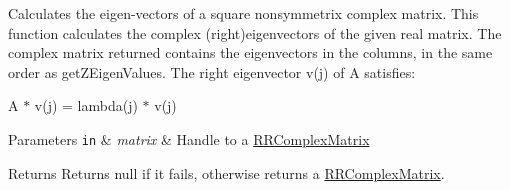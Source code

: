 Calculates the eigen-\/vectors of a square nonsymmetrix complex matrix. This function calculates the complex (right)eigenvectors of the given real matrix. The complex matrix returned contains the eigenvectors in the columns, in the same order as get\-Z\-Eigen\-Values. The right eigenvector v(j) of A satisfies\-: 

\begin{DoxyParagraph}{}
A $\ast$ v(j) = lambda(j) $\ast$ v(j) 
\end{DoxyParagraph}

\begin{DoxyParams}[1]{Parameters}
\mbox{\tt in}  & {\em matrix} & Handle to a \hyperlink{struct_r_r_complex_matrix}{R\-R\-Complex\-Matrix} \\
\hline
\end{DoxyParams}
\begin{DoxyReturn}{Returns}
Returns null if it fails, otherwise returns a \hyperlink{struct_r_r_complex_matrix}{R\-R\-Complex\-Matrix}. 
\end{DoxyReturn}

